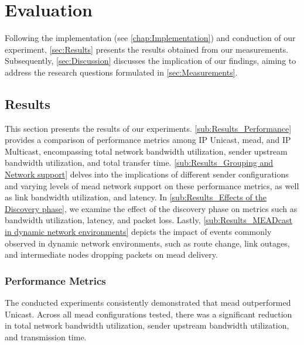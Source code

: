 \chapter{Evaluation} %
\label{chap:Evaluation}
Following the implementation (see \autoref{chap:Implementation}) and conduction
    of our experiment, \autoref{sec:Results} presents the results obtained from
    our measurements.
Subsequently, \autoref{sec:Discussion} discusses the implication of our
    findings, aiming to address the research questions formulated in
    \autoref{sec:Measurements}.

\section{Results} %
\label{sec:Results}
This section presents the results of our experiments.
\autoref{sub:Results_Performance} provides a comparison of performance metrics
    among IP Unicast, \gls{mead}, and IP Multicast, encompassing total network
    bandwidth utilization, sender upstream bandwidth utilization, and total
    transfer time.
\autoref{sub:Results_Grouping and Network support} delves into the implications
    of different sender configurations and varying levels of \gls{mead} network
    support on these performance metrics, as well as link bandwidth
    utilization, and latency.
In \autoref{sub:Results_Effects of the Discovery phase}, we examine the effect
    of the discovery phase on metrics such as bandwidth utilization, latency,
    and packet loss.
Lastly, \autoref{sub:Results_MEADcast in dynamic network environments} depicts
    the impact of events commonly observed in dynamic network environments,
    such as route change, link outages, and intermediate nodes dropping packets
    on \gls{mead} delivery.
\subsection{Performance Metrics} %
\label{sub:Results_Performance}
The conducted experiments consistently demonstrated that \gls{mead} outperformed
    Unicast.
Across all \gls{mead} configurations tested, there was a significant reduction in
    total network bandwidth utilization, sender upstream bandwidth utilization,
    and transmission time.

